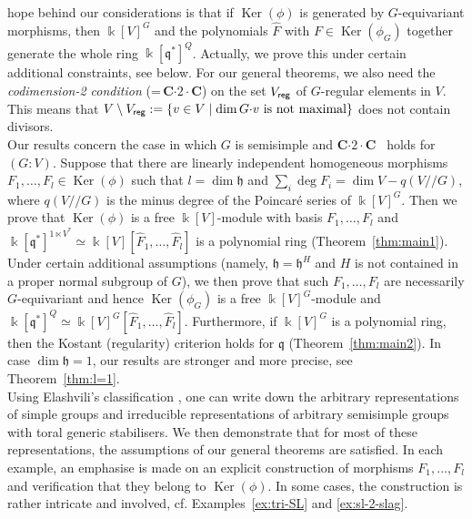 hope behind our considerations is that if ${\operatorname{Ker}}(\phi)$ is generated by $G$-equivariant morphisms, 
then ${\Bbbk}[V]^G$ and the polynomials $\hat F$ with $F\in {\operatorname{Ker}}(\phi_G)$ together generate the whole 
ring ${\Bbbk}[{{\mathfrak q}}^*]^Q$. Actually, we prove this under certain additional constraints, see below.
For our general theorems, we also  
need the {\it codimension-2 condition} (=\,\textsf{\bfseries C${\cdot}2{\cdot}$C}) on the set  $V_{\sf reg}$ of $G$-regular elements in $V$. This 
means that $V\setminus V_{\sf reg}:=\{v\in V\mid \dim G{\cdot}v \text{ is not maximal}\}$ 
does not contain divisors.
\\ \indent
Our results concern the case in which $G$ is semisimple and {\textsf{\bfseries C${\cdot}2{\cdot}$C}\ } holds for $(G:V)$.
Suppose that there are linearly independent homogeneous morphisms
$F_1,\dots,F_l\in {\operatorname{Ker}}(\phi)$ such that $l=\dim {{\mathfrak h}}$ and  $\sum_i \deg F_i=\dim V-q(V{/\!\!/} G)$, where
$q(V{/\!\!/} G)$ is the minus degree of the Poincar\'e series of ${\Bbbk}[V]^G$.
Then we prove that ${\operatorname{Ker}}(\phi)$ is a free ${\Bbbk}[V]$-module with basis $F_1,\dots,F_l$ and
${\Bbbk}[{{\mathfrak q}}^*]^{1\ltimes V^*}\simeq {\Bbbk}[V][\hat F_1,\dots,\hat F_l]$ is a polynomial ring 
(Theorem~\ref{thm:main1}). Under certain additional assumptions (namely, ${{\mathfrak h}}={{\mathfrak h}}^H$ and $H$ is 
not contained in a proper normal subgroup of $G$), we then prove that such $F_1,\dots,F_l$ are 
necessarily $G$-equivariant and hence ${\operatorname{Ker}}(\phi_G)$ is a free ${\Bbbk}[V]^G$-module and 
${\Bbbk}[{{\mathfrak q}}^*]^{Q}\simeq {\Bbbk}[V]^G[\hat F_1,\dots,\hat F_l]$. Furthermore, if ${\Bbbk}[V]^G$ is a polynomial ring, then the Kostant (regularity) criterion holds for ${{\mathfrak q}}$ (Theorem~\ref{thm:main2}). In case $\dim{{\mathfrak h}}=1$, our results are stronger and more precise, see Theorem~\ref{thm:l=1}.
\\ \indent
Using Elashvili's classification \cite{alela1,alela2}, one can write down the arbitrary representations 
of simple groups and irreducible representations of arbitrary semisimple groups with toral generic 
stabilisers. We then demonstrate that for most of these representations, the assumptions of our 
general theorems are satisfied. In each example, an emphasise is made on an explicit construction 
of morphisms $F_1,\dots,F_l$ and verification that they belong to ${\operatorname{Ker}}(\phi)$. In some cases, the 
construction is rather intricate and involved, cf. Examples~\ref{ex:tri-SL} and \ref{ex:sl-2-slag}.

